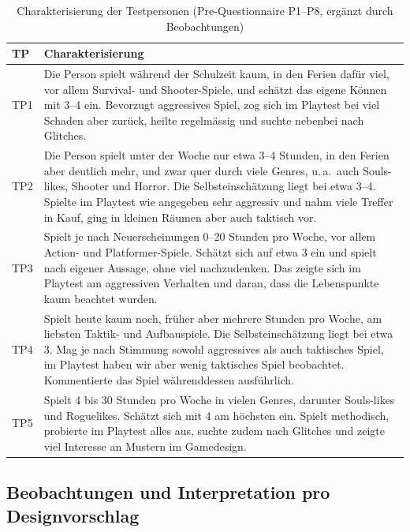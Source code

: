 \documentclass[../Main.tex]{subfiles}
\begin{document}
\begin{table}[H]
    \centering
    \small
    \renewcommand{\arraystretch}{1.3}
    \begin{tabular}{|>{\raggedright\arraybackslash}p{1.2cm}|>{\raggedright\arraybackslash}p{12.6cm}|}
        \hline
        \textbf{TP} & \textbf{Charakterisierung} \\
        \hline
        TP1 & Die Person spielt während der Schulzeit kaum, in den Ferien dafür viel, vor allem Survival- und Shooter-Spiele, und schätzt das eigene Können mit 3--4 ein. Bevorzugt aggressives Spiel, zog sich im Playtest bei viel Schaden aber zurück, heilte regelmässig und suchte nebenbei nach Glitches. \\
        \hline
        TP2 & Die Person spielt unter der Woche nur etwa 3--4 Stunden, in den Ferien aber deutlich mehr, und zwar quer durch viele Genres, u.\,a.\ auch Souls-likes, Shooter und Horror. Die Selbsteinschätzung liegt bei etwa 3--4. Spielte im Playtest wie angegeben sehr aggressiv und nahm viele Treffer in Kauf, ging in kleinen Räumen aber auch taktisch vor. \\
        \hline
        TP3 & Spielt je nach Neuerscheinungen 0--20 Stunden pro Woche, vor allem Action- und Platformer-Spiele. Schätzt sich auf etwa 3 ein und spielt nach eigener Aussage, ohne viel nachzudenken. Das zeigte sich im Playtest am aggressiven Verhalten und daran, dass die Lebenspunkte kaum beachtet wurden. \\
        \hline
        TP4 & Spielt heute kaum noch, früher aber mehrere Stunden pro Woche, am liebsten Taktik- und Aufbauspiele. Die Selbsteinschätzung liegt bei etwa 3. Mag je nach Stimmung sowohl aggressives als auch taktisches Spiel, im Playtest haben wir aber wenig taktisches Spiel beobachtet. Kommentierte das Spiel währenddessen ausführlich. \\
        \hline
        TP5 & Spielt 4 bis 30 Stunden pro Woche in vielen Genres, darunter Souls-likes und Roguelikes. Schätzt sich mit 4 am höchsten ein. Spielt methodisch, probierte im Playtest alles aus, suchte zudem nach Glitches und zeigte viel Interesse an Mustern im Gamedesign. \\
        \hline
    \end{tabular}
    \caption{Charakterisierung der Testpersonen (Pre-Questionnaire P1--P8, ergänzt durch Beobachtungen)}
    \label{tab:Testpersonen}
\end{table}

\subsection{Beobachtungen und Interpretation pro Designvorschlag} \label{sec:ErgVorschlag} \label{sec:Interpretation}
\end{document}
